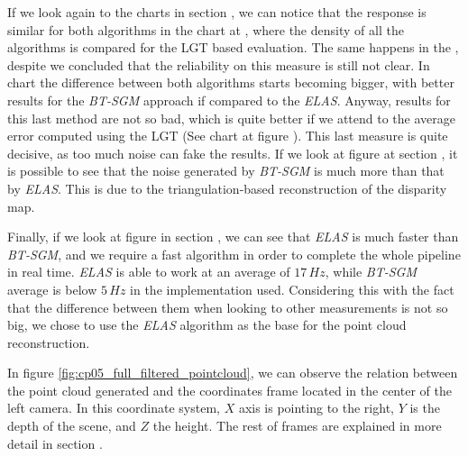 If we look again to the charts in section , we can notice that the response is similar for both algorithms in the chart at , where the density of all the algorithms is compared for the \acs{LGT} based evaluation. The same happens in the , despite we concluded that the reliability on this measure is still not clear. In chart  the difference between both algorithms starts becoming bigger, with better results for the \emph{BT-SGM} approach if compared to the \emph{ELAS}. Anyway, results for this last method are not so bad, which is quite better if we attend to the average error computed using the \acs{LGT} (See chart at figure ). This last measure is quite decisive, as too much noise can fake the results. If we look at figure  at section , it is possible to see that the noise generated by \emph{BT-SGM} is much more than that by \emph{ELAS}. This is due to the triangulation-based reconstruction of the disparity map.

Finally, if we look at figure  in section , we can see that \emph{ELAS} is much faster than \emph{BT-SGM}, and we require a fast algorithm in order to complete the whole pipeline in real time. \emph{ELAS} is able to work at an average of $17\,Hz$, while \emph{BT-SGM} average is below $5\,Hz$ in the implementation used. Considering this with the fact that the difference between them when looking to other measurements is not so big, we chose to use the \emph{ELAS} algorithm as the base for the point cloud reconstruction.

In figure \ref{fig:cp05_full_filtered_pointcloud}, we can observe the relation between the point cloud generated and the coordinates frame located in the center of the left camera. In this coordinate system, $X$ axis is pointing to the right, $Y$ is the depth of the scene, and $Z$ the height. The rest of frames are explained in more detail in section .

